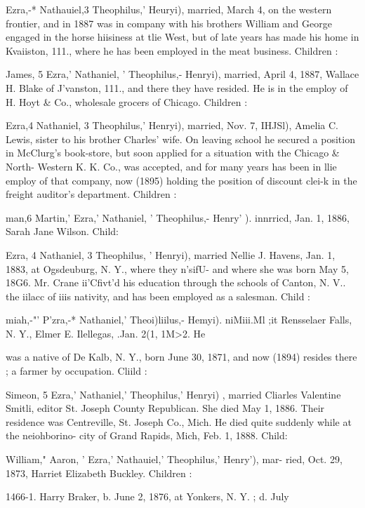 \documentclass[oneside]{book}
\begin{document}
Ezra,-* Nathauiel,3 Theophilus,' Heuryi), married, March 4, 
on the western frontier, and in 1887 was in company with his 
brothers William and George engaged in the horse hiisiness at tlie 
West, but of late years has made his home in Kvaiiston, 111., 
where he has been employed in the meat business. Children : 


James, 5 Ezra,' Nathaniel, ' Theophilus,- Henryi), married, April 
4, 1887, Wallace H. Blake of J'vanston, 111., and there they have 
resided. He is in the employ of H. Hoyt \& Co., wholesale 
grocers of Chicago. Children : 



Ezra,4 Nathaniel, 3 Theophilus,' Henryi), married, Nov. 7, IHJSl), 
Amelia C. Lewis, sister to his brother Charles' wife. On leaving 
school he secured a position in McClurg's book-store, but soon 
applied for a situation with the Chicago \& North- Western K. K. 
Co., was accepted, and for many years has been in llie employ of 
that company, now (1895) holding the position of discount clei-k 
in the freight auditor's department. Children : 


man,6 Martin,' Ezra,' Nathaniel, ' Theophilus,- Henry' ). innrricd, 
Jan. 1, 1886, Sarah Jane Wilson. Child: 


Ezra, 4 Nathaniel, 3 Theophilus, ' Henryi), married Nellie J. 
Havens, Jan. 1, 1883, at Ogsdeuburg, N. Y., where they n'sifU- 
and where she was born May 5, 18G6. Mr. Crane ii'Cfivt'd his 
education through the schools of Canton, N. V.. the iilacc of iiis 
nativity, and has been employed as a salesman. Child : 


miah,-"' P'zra,-* Nathaniel,' Theoi)liilus,- Hemyi). niMiii.Ml ;it 
Rensselaer Falls, N. Y., Elmer E. Ilellegas, .Jan. 2(1, 1M>2. He 




was a native of De Kalb, N. Y., born June 30, 1871, and now 
(1894) resides there ; a farmer by occupation. Cliild : 


Simeon, 5 Ezra,' Nathaniel,' Theophilus,' Henryi) , married Cliarles 
Valentine Smitli, editor St. Joseph County Republican. She died 
May 1, 1886. Their residence was Centreville, St. Joseph Co., 
Mich. He died quite suddenly while at the neiohborino- city of 
Grand Rapids, Mich, Feb. 1, 1888. Child: 


William," Aaron, ' Ezra,' Nathauiel,' Theophilus,' Henry'), mar- 
ried, Oct. 29, 1873, Harriet Elizabeth Buckley. Children : 

1466-1. Harry Braker, b. June 2, 1876, at Yonkers, N. Y. ; d. July 
\end{document}
